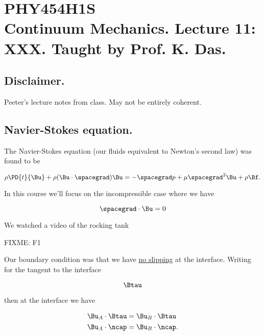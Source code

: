 
%

\chapter{PHY454H1S\\Continuum Mechanics.  Lecture 11: XXX.  Taught by Prof. K. Das.}
\label{chap:continuumL11}
{}
\date{Feb 15, 2012}

\beginArtWithToc

\section{Disclaimer.}

Peeter's lecture notes from class.  May not be entirely coherent.

\section{Navier-Stokes equation.}

The Navier-Stokes equation (our fluids equivalent to Newton's second law) was found to be

\begin{equation}\label{eqn:continuumL11:10}
\rho \PD{t}{\Bu} + \rho (\Bu \cdot \spacegrad) \Bu = - \spacegrad p + \mu \spacegrad^2 \Bu + \rho \Bf.
\end{equation}

In this course we'll focus on the incompressible case where we have

\begin{equation}\label{eqn:continuumL11:30}
\spacegrad \cdot \Bu = 0
\end{equation}

We watched a video of the rocking tank

FIXME: F1

Our boundary condition was that we have \underline{no slipping} at the interface.  Writing for the tangent to the interface

\begin{equation}\label{eqn:continuumL11:50}
\Btau
\end{equation}

then at the interface we have

\begin{align}\label{eqn:continuumL11:70}
\Bu_A \cdot \Btau &= \Bu_B \cdot \Btau \\
\Bu_A \cdot \ncap &= \Bu_B \cdot \ncap.
\end{align}

